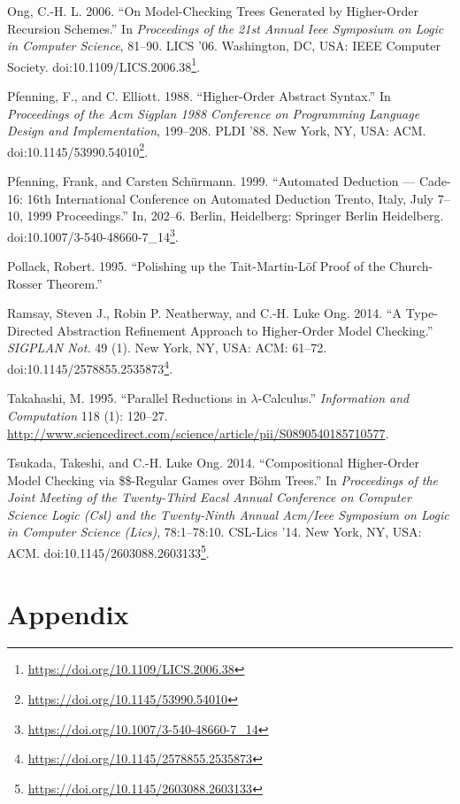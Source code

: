 \documentclass[a4paper, 12pt, twoside]{style/ociamthesis}
\theoremstyle{plain}
\theoremstyle{definition}
\theoremstyle{remark}
\renewcommand{\href}[2]{#2\footnote{\url{#1}}}
\begin{document}
\hypertarget{ref-ong06}{}
Ong, C.-H. L. 2006. ``On Model-Checking Trees Generated by Higher-Order
Recursion Schemes.'' In \emph{Proceedings of the 21st Annual Ieee
Symposium on Logic in Computer Science}, 81--90. LICS '06. Washington,
DC, USA: IEEE Computer Society.
doi:\href{https://doi.org/10.1109/LICS.2006.38}{10.1109/LICS.2006.38}.

\hypertarget{ref-pfenning88}{}
Pfenning, F., and C. Elliott. 1988. ``Higher-Order Abstract Syntax.'' In
\emph{Proceedings of the Acm Sigplan 1988 Conference on Programming
Language Design and Implementation}, 199--208. PLDI '88. New York, NY,
USA: ACM.
doi:\href{https://doi.org/10.1145/53990.54010}{10.1145/53990.54010}.

\hypertarget{ref-pfenning99}{}
Pfenning, Frank, and Carsten Schürmann. 1999. ``Automated Deduction ---
Cade-16: 16th International Conference on Automated Deduction Trento,
Italy, July 7--10, 1999 Proceedings.'' In, 202--6. Berlin, Heidelberg:
Springer Berlin Heidelberg.
doi:\href{https://doi.org/10.1007/3-540-48660-7_14}{10.1007/3-540-48660-7\_14}.

\hypertarget{ref-pollack95}{}
Pollack, Robert. 1995. ``Polishing up the Tait-Martin-Löf Proof of the
Church-Rosser Theorem.''

\hypertarget{ref-ramsay14}{}
Ramsay, Steven J., Robin P. Neatherway, and C.-H. Luke Ong. 2014. ``A
Type-Directed Abstraction Refinement Approach to Higher-Order Model
Checking.'' \emph{SIGPLAN Not.} 49 (1). New York, NY, USA: ACM: 61--72.
doi:\href{https://doi.org/10.1145/2578855.2535873}{10.1145/2578855.2535873}.

\hypertarget{ref-takahashi95}{}
Takahashi, M. 1995. ``Parallel Reductions in \(\lambda\)-Calculus.''
\emph{Information and Computation} 118 (1): 120--27.
\url{http://www.sciencedirect.com/science/article/pii/S0890540185710577}.

\hypertarget{ref-tsukada14}{}
Tsukada, Takeshi, and C.-H. Luke Ong. 2014. ``Compositional Higher-Order
Model Checking via \$\$-Regular Games over Böhm Trees.'' In
\emph{Proceedings of the Joint Meeting of the Twenty-Third Eacsl Annual
Conference on Computer Science Logic (Csl) and the Twenty-Ninth Annual
Acm/Ieee Symposium on Logic in Computer Science (Lics)}, 78:1--78:10.
CSL-Lics '14. New York, NY, USA: ACM.
doi:\href{https://doi.org/10.1145/2603088.2603133}{10.1145/2603088.2603133}.




\setcounter{secnumdepth}{0}
\chapter*{Appendix}\label{appendix}

\newpage

\newpage
\end{document}
